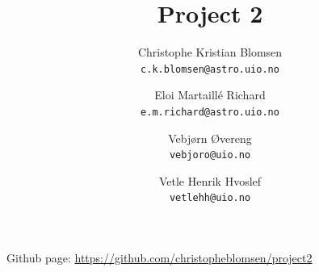 \documentclass[a4paper,10pt,english]{article}
\begin{document}
	
		
		
		
		
		
		\author{Christophe Kristian Blomsen\\
			\texttt{c.k.blomsen@astro.uio.no}
			\and
			Eloi Martaillé Richard\\
			\texttt{e.m.richard@astro.uio.no}
			\and
			Vebjørn Øvereng\\
			\texttt{vebjoro@uio.no}
			\and
			Vetle Henrik Hvoslef\\
			\texttt{vetlehh@uio.no}}
		\title{Project 2}

			\begin{titlepage}
				\maketitle
				\tableofcontents
				
			\end{titlepage}
			
			
			Github page: \url{https://github.com/christopheblomsen/project2}
			
\end{document}
